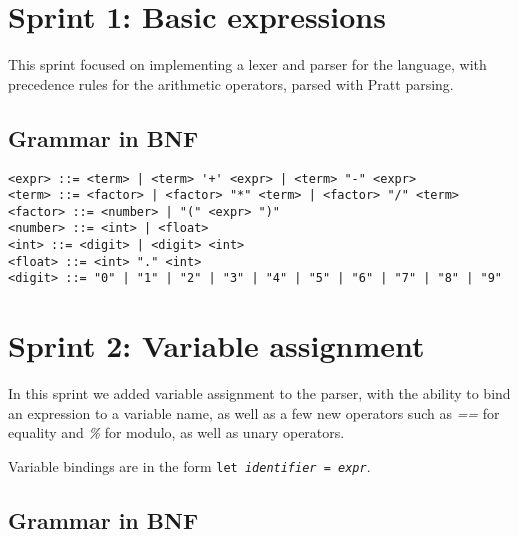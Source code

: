 \section{Sprint 1: Basic expressions}\label{sec:sprint-1:-basic-expressions}

This sprint focused on implementing a lexer and parser for the language, with precedence rules for the arithmetic 
operators, parsed with Pratt parsing.

\subsection{Grammar in BNF}\label{subsec:grammar-in-bnf1}

\begin{verbatim}
<expr> ::= <term> | <term> '+' <expr> | <term> "-" <expr>
<term> ::= <factor> | <factor> "*" <term> | <factor> "/" <term>
<factor> ::= <number> | "(" <expr> ")"
<number> ::= <int> | <float>
<int> ::= <digit> | <digit> <int>
<float> ::= <int> "." <int>
<digit> ::= "0" | "1" | "2" | "3" | "4" | "5" | "6" | "7" | "8" | "9"
\end{verbatim}

\section{Sprint 2: Variable assignment}\label{sec:variable-assignment}

In this sprint we added variable assignment to the parser, with the ability to bind an expression to a variable 
name, as well as a few new operators such as \textit{==} for equality and \textit{\%} for modulo, as well as 
unary operators.

Variable bindings are in the form \texttt{let \textit{identifier} = \textit{expr}}.

\subsection{Grammar in BNF}\label{subsec:grammar-in-bnf2}


